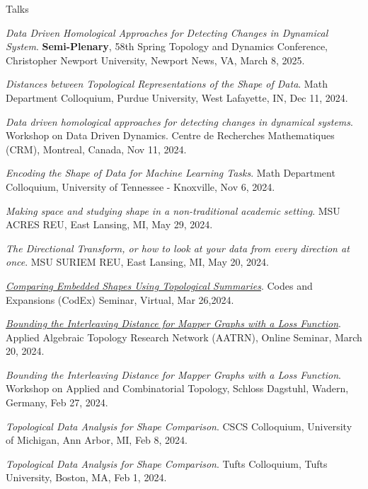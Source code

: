 \documentclass{resume} %
\begin{document}
\begin{rSection}{Talks}
\begin{etaremune}
\item\emph{Data Driven Homological Approaches for Detecting Changes in Dynamical System}. \textbf{Semi-Plenary}, 58th Spring Topology and Dynamics Conference, Christopher Newport University, Newport News, VA, March 8, 2025. 

\item\emph{Distances between Topological Representations of the Shape of Data}. Math Department Colloquium, Purdue University, West Lafayette, IN, Dec 11, 2024. 

\item\emph{Data driven homological approaches for detecting changes in dynamical systems}. Workshop on Data Driven Dynamics. Centre de Recherches Mathematiques (CRM), Montreal, Canada, Nov 11, 2024. 

\item\emph{Encoding the Shape of Data for Machine Learning Tasks}. Math Department Colloquium, University of Tennessee - Knoxville, Nov 6, 2024. 

\item\emph{Making space and studying shape in a non-traditional academic setting}. MSU ACRES REU, East Lansing, MI, May 29, 2024. 

\item\emph{The Directional Transform, or how to look at your data from every direction at once}. MSU SURIEM REU, East Lansing, MI, May 20, 2024. 

\item\emph{\href{https://youtu.be/YU37CoqA7Ao}{Comparing Embedded Shapes Using Topological Summaries}}. Codes and Expansions (CodEx) Seminar, Virtual, Mar 26,2024. 

\item\emph{\href{https://youtu.be/PHu6u8XXyh8}{Bounding the Interleaving Distance for Mapper Graphs with a Loss Function}}. Applied Algebraic Topology Research Network (AATRN), Online Seminar, March 20, 2024. 

\item\emph{Bounding the Interleaving Distance for Mapper Graphs with a Loss Function}. Workshop on Applied and Combinatorial Topology, Schloss Dagstuhl, Wadern, Germany, Feb 27, 2024. 

\item\emph{Topological Data Analysis for Shape Comparison}. CSCS Colloquium, University of Michigan, Ann Arbor, MI, Feb 8, 2024. 

\item\emph{Topological Data Analysis for Shape Comparison}. Tufts Colloquium, Tufts University, Boston, MA, Feb 1, 2024. 


\end{etaremune}
\end{rSection}
\end{document}
